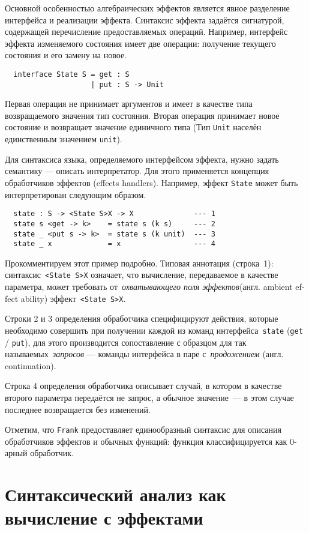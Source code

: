 \documentclass [a4paper] {article}
\begin{document}
Основной особенностью алгебраических эффектов является явное разделение
интерфейса и реализации эффекта. Синтаксис эффекта задаётся сигнатурой,
содержащей перечисление предоставляемых операций. Например, интерфейс
эффекта изменяемого состояния имеет две операции: получение текущего
состояния и его замену на новое.
\begin{verbatim}
  interface State S = get : S
                    | put : S -> Unit
\end{verbatim}
Первая операция не принимает аргументов и имеет в качестве типа возвращаемого
значения тип состояния. Вторая операция принимает новое состояние и возвращает
значение единичного типа (Тип \texttt{Unit} населён единственным значением
\texttt{unit}).

Для синтаксиса языка, определяемого интерфейсом эффекта, нужно задать
семантику --- описать интерпретатор. Для этого применяется концепция
обработчиков эффектов  (effects handlers). Например, эффект \texttt{State}
может быть интерпретирован следующим образом.
\begin{verbatim}
  state : S -> <State S>X -> X              --- 1
  state s <get -> k>    = state s (k s)     --- 2
  state _ <put s -> k>  = state s (k unit)  --- 3
  state _ x             = x                 --- 4
\end{verbatim}

Прокомментируем этот пример подробно. Типовая аннотация (строка~1): синтаксис~\texttt{<State S>X} означает, что вычисление, передаваемое в качестве параметра, может
требовать от~\emph{охватывающего поля эффектов}(англ. \foreignlanguage{english}{ambient effect ability}) эффект~\texttt{<State S>X}.

Строки 2 и 3 определения обработчика специфицируют действия, которые необходимо совершить при получении каждой из команд интерфейса~\texttt{state} (\texttt{get} / \texttt{put}),
для этого производится сопоставление с образцом для так называемых~\emph{запросов} --- команды интерфейса в паре с~\emph{продожением} (англ. continuation).

Строка 4 определения обработчика описывает случай, в котором в качестве второго параметра передаётся не запрос, а обычное значение~--- в этом случае последнее возвращается без изменений.

Отметим, что \texttt{Frank} предоставляет единообразный синтаксис для описания обработчиков эффектов и обычных функций: функция классифицируется как 0-арный обработчик.

\section{Синтаксический анализ как вычисление с эффектами}
\end{document}
